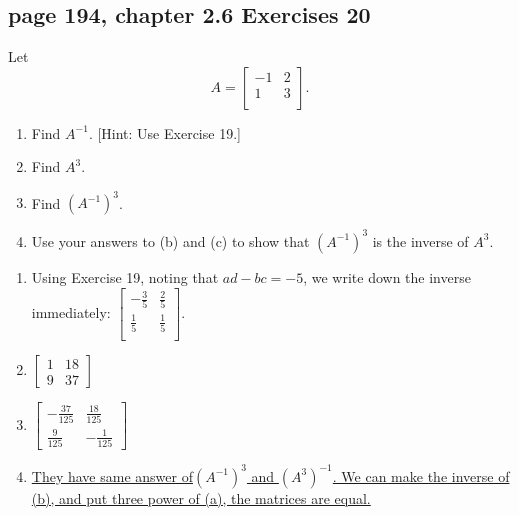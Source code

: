 \documentclass[sigconf]{acmart}
\begin{document}
\subsection{page 194, chapter 2.6 Exercises 20}
\begin{shaded}
    Let\\
    \[A = \left[\begin{matrix}
        -1 & 2 \\
        1 & 3 \\
        \end{matrix}\right].\]
    \begin{enumerate}[label=(\alph*)]
    	\item Find $A^{-1}$. [Hint: Use Exercise 19.]
    	\item Find $A^3$.
    	\item Find $(A^{-1})^3$.
            \item Use your answers to (b) and (c) to show that $(A^{-1})^3$ is the inverse of $A^3$.
    \end{enumerate}
\end{shaded}  
\begin{enumerate}[label=(\alph*)]
        \item Using Exercise 19, noting that $ad-bc = -5$, we write down the inverse immediately:
        \(\left[\begin{matrix}
            -\frac{3}{5} & \frac{2}{5} \\
            \frac{1}{5} & \frac{1}{5} \\
            \end{matrix}\right].\)
	\item \underline{$\begin{bmatrix}1&18\\9&37\end{bmatrix}$}
	\item \underline{$\begin{bmatrix}-\frac{37}{125}&\frac{18}{125}\\\frac{9}{125}&-\frac{1}{125}\end{bmatrix}$}
	\item \uline{They have same answer of$(A^{-1})^3$ and $(A^3)^{-1}$. We can make the inverse of (b), and put three power of (a), the matrices are equal. }
\end{enumerate}
\end{document}
